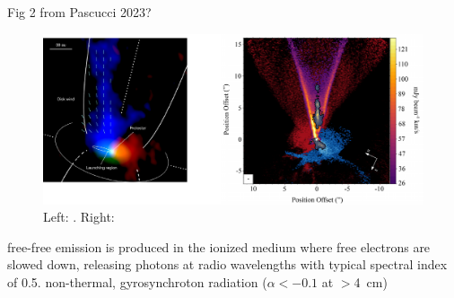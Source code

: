 \documentclass[12pt]{mythesis}
\begin{document}
Fig 2 from Pascucci 2023?
\begin{figure}[h]
	\begin{center}
		\includegraphics[width=\textwidth]{figures/molecularwinds.pdf}
		\caption[Molecular winds]{Left: \citet{bjerkeli2016}. Right: \citet{devalon2020, pascucci2023}}
	\end{center}
\end{figure}


 free-free emission is produced in the ionized medium where free electrons are slowed down, releasing photons at radio wavelengths with typical spectral index of 0.5. non-thermal, gyrosynchroton radiation  ($\alpha<-0.1$ at $>$4~cm) 

\end{document}

